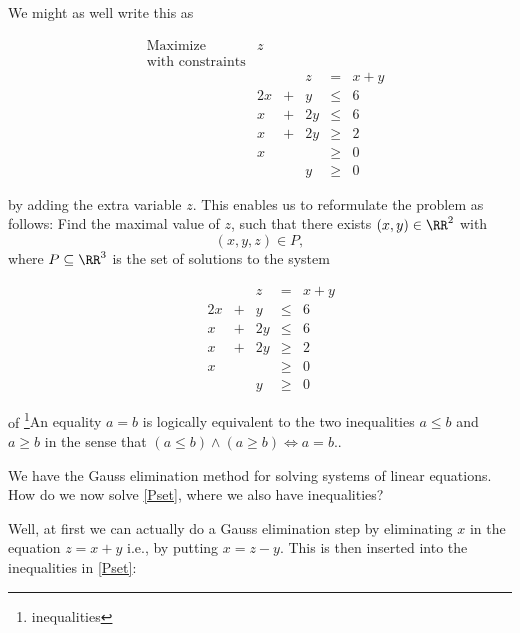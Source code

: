 \documentclass{article}
\begin{document}
We might as well write this as

$$
  \begin{array}{llrrrl}
    &\text{Maximize} &z\\
    &\text{with constraints}\\
    &&&& z &= &x + y\\
    &&2 x &+ &y &\leq &6\\
    &&x &+ &2 y &\leq &6\\
    &&x &+ &2 y &\geq &2\\
    &&x &&&\geq &0\\
    &&&&y &\geq &0
  \end{array}
$$
  
  by adding the extra variable $z$. This enables us to reformulate the problem as follows: Find
  the maximal value of $z$, such that there exists $(x, y)\in \RR^2$ with
  $$
  (x, y, z)\in P,
  $$
  where $P\subseteq \RR^3$ is the set of solutions to the system


\begin{equation}\label{Pset}

  \begin{array}{llrrrl}
    &&&& z &= &x + y\\
    &&2 x &+ &y &\leq &6\\
    &&x &+ &2 y &\leq &6\\
    &&x &+ &2 y &\geq &2\\
    &&x &&&\geq &0\\
    &&&&y &\geq &0
  \end{array}

\end{equation}
  


  of \footnote{inequalities}{An equality $a = b$ is logically equivalent to the two
    inequalities $a\leq b$ and $a \geq b$ in the sense that $(a\leq b) \wedge (a\geq b) \iff a = b$.}.

  We have the Gauss elimination method for solving systems of linear equations. How do we now solve
  \eqref{Pset}, where we also have inequalities?

  Well, at first we can actually do a Gauss elimination step by eliminating $x$ in the equation
  $z = x + y$ i.e., by putting $x = z - y$. This is then inserted into the inequalities in
  \eqref{Pset}:
\end{document}
